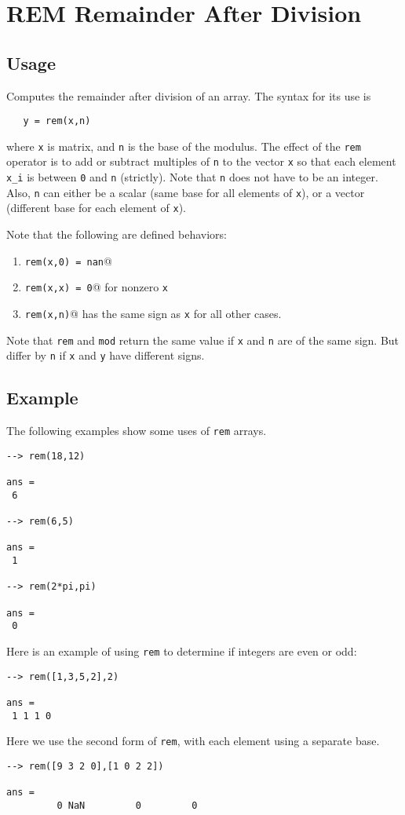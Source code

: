 \section{REM Remainder After Division}

\subsection{Usage}

Computes the remainder after division of an array.  The syntax for its use is
\begin{verbatim}
   y = rem(x,n)
\end{verbatim}
where \verb|x| is matrix, and \verb|n| is the base of the modulus.  The
effect of the \verb|rem| operator is to add or subtract multiples of \verb|n|
to the vector \verb|x| so that each element \verb|x_i| is between \verb|0| and \verb|n|
(strictly).  Note that \verb|n| does not have to be an integer.  Also,
\verb|n| can either be a scalar (same base for all elements of \verb|x|), or a
vector (different base for each element of \verb|x|).

Note that the following are defined behaviors:
\begin{enumerate}
\item  \verb|rem(x,0) = nan|@

\item  \verb|rem(x,x) = 0|@ for nonzero \verb|x|

\item  \verb|rem(x,n)|@ has the same sign as \verb|x| for all other cases.

\end{enumerate}
Note that \verb|rem| and \verb|mod| return the same value if \verb|x| and \verb|n|
are of the same sign.  But differ by \verb|n| if \verb|x| and \verb|y| have 
different signs.
\subsection{Example}

The following examples show some uses of \verb|rem|
arrays.
\begin{verbatim}
--> rem(18,12)

ans = 
 6 

--> rem(6,5)

ans = 
 1 

--> rem(2*pi,pi)

ans = 
 0 
\end{verbatim}
Here is an example of using \verb|rem| to determine if integers are even
 or odd:
\begin{verbatim}
--> rem([1,3,5,2],2)

ans = 
 1 1 1 0 
\end{verbatim}
Here we use the second form of \verb|rem|, with each element using a 
separate base.
\begin{verbatim}
--> rem([9 3 2 0],[1 0 2 2])

ans = 
         0 NaN         0         0 
\end{verbatim}
